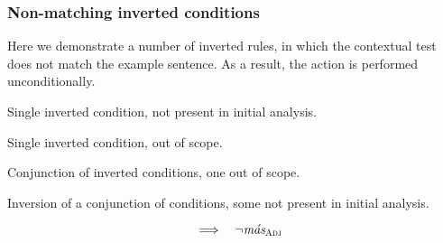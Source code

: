 \subsubsection{Non-matching inverted conditions}

Here we demonstrate a number of inverted rules, in which the contextual test does not match the example sentence. As a result, the action is performed unconditionally.

 Single inverted condition, not present in initial analysis.

 Single inverted condition, out of scope.

 Conjunction of inverted conditions, one out of scope.

 Inversion of a conjunction of conditions, some not present in initial analysis.

\begin{equation}
 \quad\Longrightarrow\quad \neg{}\text{\em m\'{a}s}_{\text{\sc Adj}} 
\end{equation}








